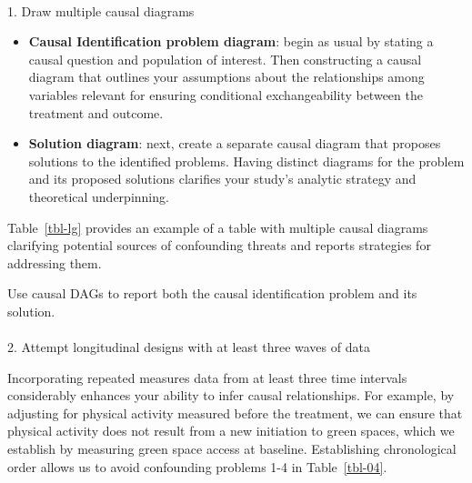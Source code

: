 \documentclass[
  singlecolumn]{article}
\makeatletter
\let\oldparagraph\paragraph
\renewcommand{\paragraph}{
    \@ifstar
      \xxxParagraphStar
      \xxxParagraphNoStar
  }
\newcommand{\xxxParagraphStar}[1]{\oldparagraph*{#1}\mbox{}}
\newcommand{\xxxParagraphNoStar}[1]{\oldparagraph{#1}\mbox{}}
\makeatother
\begin{document}
\paragraph{1. Draw multiple causal
diagrams}\label{draw-multiple-causal-diagrams-1}

\begin{itemize}
\item
  \textbf{Causal Identification problem diagram}: begin as usual by
  stating a causal question and population of interest. Then
  constructing a causal diagram that outlines your assumptions about the
  relationships among variables relevant for ensuring conditional
  exchangeability between the treatment and outcome.
\item
  \textbf{Solution diagram}: next, create a separate causal diagram that
  proposes solutions to the identified problems. Having distinct
  diagrams for the problem and its proposed solutions clarifies your
  study's analytic strategy and theoretical underpinning.
\end{itemize}

Table~\ref{tbl-lg} provides an example of a table with multiple causal
diagrams clarifying potential sources of confounding threats and reports
strategies for addressing them.

\begin{table}

\caption{\label{tbl-lg}Use causal DAGs to report both the causal
identification problem and its solution.}

\centering{

\examplelongitudinal

}

\end{table}%

\paragraph{2. Attempt longitudinal designs with at least three waves of
data}\label{attempt-longitudinal-designs-with-at-least-three-waves-of-data}

Incorporating repeated measures data from at least three time intervals
considerably enhances your ability to infer causal relationships. For
example, by adjusting for physical activity measured before the
treatment, we can ensure that physical activity does not result from a
new initiation to green spaces, which we establish by measuring green
space access at baseline. Establishing chronological order allows us to
avoid confounding problems 1-4 in Table~\ref{tbl-04}.
\end{document}
